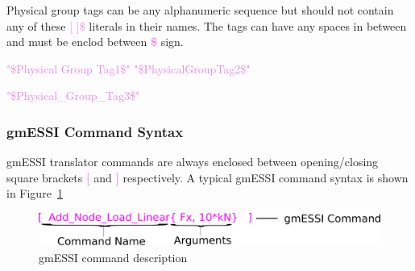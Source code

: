 \documentclass[11pt]{article}
\newcommand{\rcancel}[1]{\renewcommand\CancelColor{\color{red}}\xcancel{#1}}
\begin{document}
Physical  group tags can be any alphanumeric sequence but should not contain any
of  these  \textcolor{violet}{[  ]\$} literals in their names. The tags can have
any spaces in between and must be enclod between \textcolor{violet}{\textbf{\$}} sign.\\
\centerline       {\textcolor{violet}{"\$Physical       Group      Tag1\$"      
"\$PhysicalGroupTag2\$"}                 \rcancel{\textcolor{violet}{"\$Physical
\$GroupTag3\$"}}}

\centerline{\rcancel{\textcolor{violet}{"\$Physical              [GroupTag3\$"}}
\textcolor{violet}{"\$Physical\_Group\_Tag3\$"}
\rcancel{\textcolor{violet}{"\$Physical GroupTag3"}}}

\subsubsection{gmESSI Command Syntax}

gmESSI translator commands are always enclosed between opening/closing square brackets 
\textbf{\textcolor{violet}{[}} and \textbf{\textcolor{violet}{]}} respectively. 
A typical gmESSI command syntax is shown in Figure~\ref{gmESSI-command}

\begin{figure}[h]
  \includegraphics[scale=1.8]{Images/gmESSICommandSyntax.png}
  \centering
  \caption{\label{gmESSI-command} gmESSI command description}
\end{figure}
\end{document}
